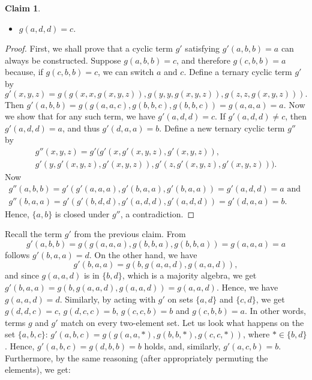 \documentclass[11pt]{amsart}
\theoremstyle{definition}
\theoremstyle{remark}
\theoremstyle{plain}
\newtheorem{claim}[thm]{Claim}
\begin{document}
\begin{enumerate}[wide, labelindent=0pt]
\begin{enumerate}[wide, labelindent=0pt]
\begin{claim}
\begin{itemize}
        \item $g(a,d,d)=c$.
    \end{itemize}
    \end{claim}
    \begin{proof}
     First, we shall prove that a cyclic term $g'$ satisfying $g'(a,b,b)=a$ can always be constructed. Suppose $g(a,b,b)=c$, and therefore $g(c,b,b)=a$ because, if $g(c,b,b)=c$, we can switch $a$ and $c$. Define a ternary cyclic term $g'$ by $$g'(x,y,z)=g(g(x,x,g(x,y,z)),g(y,y,g(x,y,z)),g(z,z,g(x,y,z))).$$ Then $g'(a,b,b)=g(g(a,a,c),g(b,b,c),g(b,b,c))=g(a,a,a)=a$. Now we show that for any such term, we have $g'(a,d,d)=c$. If $g'(a,d,d)\neq c$, then $g'(a,d,d)=a$, and thus $g'(d,a,a)=b$. Define a new ternary cyclic term $g''$ by 
$$
\begin{gathered}
g''(x,y,z)=g'(g'(x,g'(x,y,z),g'(x,y,z)),\\
g'(y,g'(x,y,z),g'(x,y,z)),g'(z,g'(x,y,z),g'(x,y,z))).
\end{gathered}
$$ Now 
     $$
     \begin{gathered}
     g''(a,b,b)=g'(g'(a,a,a),g'(b,a,a),g'(b,a,a))=g'(a,d,d)=a\text{ and }\\
     g''(b,a,a)=g'(g'(b,d,d),g'(a,d,d),g'(a,d,d))=g'(d,a,a)=b.
     \end{gathered}
     $$ 
     Hence, $\{a,b\}$ is closed under $g''$, a contradiction.
    \end{proof}
   Recall the term $g'$ from the previous claim. From $$g'(a,b,b)=g(g(a,a,a),g(b,b,a),g(b,b,a))=g(a,a,a)=a$$ follows $g'(b,a,a)=d$. On the other hand, we have $$g'(b,a,a)= g(b,g(a,a,d), g(a,a,d)),$$ and since $g(a,a,d)$ is in $\{b,d\}$, which is a majority algebra, we get $g'(b,a,a)=g(b, g(a,a,d), g(a,a,d)) = g(a,a,d)$. Hence, we have $g(a,a,d)=d$. Similarly, by acting with $g'$ on sets $\{a,d\}$ and $\{c,d\}$, we get $g(d,d,c)=c$, $g(d,c,c)=b$, $g(c,c,b)=b$ and $g(c,b,b)=a$. In other words, terms $g$ and $g'$ match on every two-element set. Let us look what happens on the set $\{a,b,c\}$: $g'(a,b,c)=g(g(a,a,\ast),g(b,b,\ast),g(c,c,\ast))$, where $\ast\in\{b,d\}$. Hence, $g'(a,b,c)=g(d,b,b)=b$ holds, and, similarly, $g'(a,c,b)=b$. Furthermore, by the same reasoning (after appropriately permuting the elements), we get:

\end{enumerate}
\end{enumerate}
\end{document}
